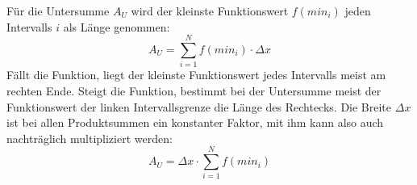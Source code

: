 \begin{figure}[h!]
\end{figure}

F\"{u}r die Untersumme $A_U$ wird der kleinste Funktionswert $f(min_i)$ jeden Intervalls $i$ als L\"{a}nge genommen: $$A_U = \sum_{i=1}^{N} f(min_i) \cdot \Delta x$$ F\"{a}llt die Funktion, liegt der kleinste Funktionswert jedes Intervalls meist am rechten Ende. Steigt die Funktion, bestimmt bei der Untersumme meist der Funktionswert der linken Intervallsgrenze die L\"{a}nge des Rechtecks. Die Breite $\Delta x$ ist bei allen Produktsummen ein konstanter Faktor, mit ihm kann also auch nachtr\"{a}glich multipliziert werden: $$A_U = \Delta x \cdot \sum_{i=1}^{N} f(min_i)$$

\pagebreak


